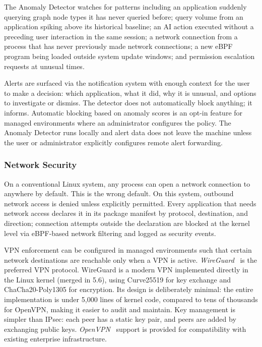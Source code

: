 The Anomaly Detector watches for patterns including an application suddenly
querying graph node types it has never queried before; query volume from an
application spiking above its historical baseline; an AI action executed
without a preceding user interaction in the same session; a network connection
from a process that has never previously made network connections; a new eBPF
program being loaded outside system update windows; and permission escalation
requests at unusual times.

Alerts are surfaced via the notification system with enough context for the
user to make a decision: which application, what it did, why it is unusual,
and options to investigate or dismiss. The detector does not automatically
block anything; it informs. Automatic blocking based on anomaly scores is an
opt-in feature for managed environments where an administrator configures the
policy. The Anomaly Detector runs locally and alert data does not leave the
machine unless the user or administrator explicitly configures remote alert
forwarding.

\subsubsection{Network Security}
\label{sec:network-security}

On a conventional Linux system, any process can open a network connection to
anywhere by default. This is the wrong default. On this system, outbound
network access is denied unless explicitly permitted. Every application that
needs network access declares it in its package manifest by protocol,
destination, and direction; connection attempts outside the declaration are
blocked at the kernel level via eBPF-based network filtering and logged as
security events.

VPN enforcement can be configured in managed environments such that certain
network destinations are reachable only when a VPN is active. \emph{WireGuard}~\cite{wireguard} is the preferred VPN protocol. WireGuard is
a modern VPN implemented directly in the Linux kernel (merged in 5.6), using
Curve25519 for key exchange and ChaCha20-Poly1305 for encryption. Its design
is deliberately minimal: the entire implementation is under 5,000 lines of
kernel code, compared to tens of thousands for OpenVPN, making it easier to
audit and maintain. Key management is simpler than IPsec: each peer has a
static key pair, and peers are added by exchanging public keys.
\emph{OpenVPN}~\cite{openvpn} support is provided for compatibility with
existing enterprise infrastructure.

